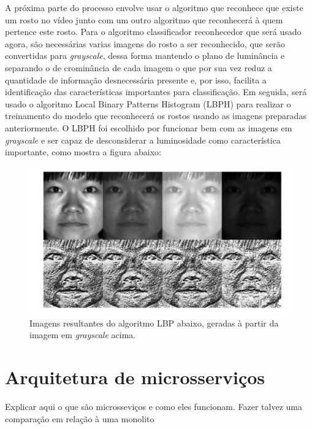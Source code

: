 \documentclass[12pt, %
openright, 
oneside, %
a4paper,    %
brazil]{facom-ufu-abntex2}
\begin{document}
A próxima parte do processo envolve usar o algoritmo que reconhece que existe
um rosto no vídeo junto com um outro algoritmo que reconhecerá à quem pertence
este rosto. Para o algoritmo classificador reconhecedor que será usado agora,
são necessárias varias imagens do rosto a ser reconhecido, que serão
convertidas para \emph{grayscale}, dessa forma mantendo o plano de luminância e
separando o de crominância de cada imagem o que por sua vez reduz a quantidade
de informação desnecessária presente e, por isso, facilita a identificação das
características importantes para classificação. Em seguida, será usado o
algoritmo Local Binary Patterns Histogram (LBPH) para realizar o treinamento do
modelo que reconhecerá os rostos usando as imagens preparadas anteriormente. O
LBPH foi escolhido por funcionar bem com as imagens em \emph{grayscale} e ser
capaz de desconsiderar a luminosidade como característica importante, como
mostra a figura abaixo:

\begin{figure}[!ht]
	\centering
	\includegraphics[width=0.7\linewidth]{grayscale.PNG}
	\caption[De \emph{grayscale} para LBP
	]{Imagens resultantes do algoritmo LBP abaixo, geradas à partir da imagem em \emph{grayscale} acima.}
	\label{fig:graficosVariandoTamanhoRede}
\end{figure}

\section{Arquitetura de microsserviços}

Explicar aqui o que são microsseviços e como eles funcionam. Fazer talvez uma
comparação em relação à uma monolito
\end{document}
